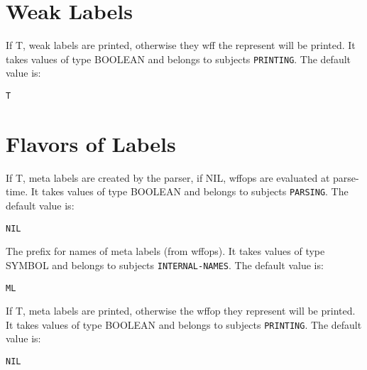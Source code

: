 \section{Weak Labels}

\begin{description} 
\item[PRINT-WEAK]  
If T, weak labels are printed, otherwise they wff the represent
will be printed.
It takes values of type BOOLEAN and belongs to subjects \texttt{PRINTING}.  The default value is: \begin{lstlisting}
T
\end{lstlisting}

\item
\end{description}

\section{Flavors of Labels}

\begin{description} 
\item[MAKE-WFFOPS-LABELS]  
If T, meta labels are created by the parser, if NIL, wffops are
evaluated at parse-time.
It takes values of type BOOLEAN and belongs to subjects \texttt{PARSING}.  The default value is: \begin{lstlisting}
NIL
\end{lstlisting}

\item[META-LABEL-NAME]  
The prefix for names of meta labels (from wffops).
It takes values of type SYMBOL and belongs to subjects \texttt{INTERNAL-NAMES}.  The default value is: \begin{lstlisting}
ML
\end{lstlisting}

\item[PRINT-META]  
If T, meta labels are printed, otherwise the wffop they represent
will be printed.
It takes values of type BOOLEAN and belongs to subjects \texttt{PRINTING}.  The default value is: \begin{lstlisting}
NIL
\end{lstlisting}

\item
\end{description}

